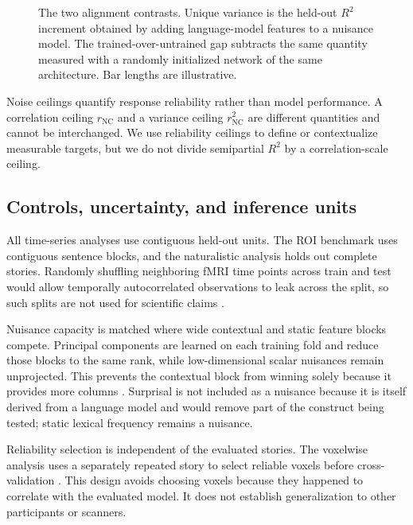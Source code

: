 \begin{figure}[t]
  \centering
  \resizebox{0.98\textwidth}{!}{}
  \caption{The two alignment contrasts. Unique variance is the held-out $R^2$ increment obtained by adding language-model features to a nuisance model. The trained-over-untrained gap subtracts the same quantity measured with a randomly initialized network of the same architecture. Bar lengths are illustrative.}
  \label{fig:uniquevar}
\end{figure}

Noise ceilings quantify response reliability rather than model performance.
A correlation ceiling $r_{\mathrm{NC}}$ and a variance ceiling $r_{\mathrm{NC}}^2$ are different quantities and cannot be interchanged.
We use reliability ceilings to define or contextualize measurable targets, but we do not divide semipartial $R^2$ by a correlation-scale ceiling.

\subsection{Controls, uncertainty, and inference units}

All time-series analyses use contiguous held-out units.
The ROI benchmark uses contiguous sentence blocks, and the naturalistic analysis holds out complete stories.
Randomly shuffling neighboring fMRI time points across train and test would allow temporally autocorrelated observations to leak across the split, so such splits are not used for scientific claims \autocite{hadidi2026}.

Nuisance capacity is matched where wide contextual and static feature blocks compete.
Principal components are learned on each training fold and reduce those blocks to the same rank, while low-dimensional scalar nuisances remain unprojected.
This prevents the contextual block from winning solely because it provides more columns .
Surprisal is not included as a nuisance because it is itself derived from a language model and would remove part of the construct being tested; static lexical frequency remains a nuisance.

Reliability selection is independent of the evaluated stories.
The voxelwise analysis uses a separately repeated story to select reliable voxels before cross-validation \autocite{lage2019,lebel2023}.
This design avoids choosing voxels because they happened to correlate with the evaluated model.
It does not establish generalization to other participants or scanners.

